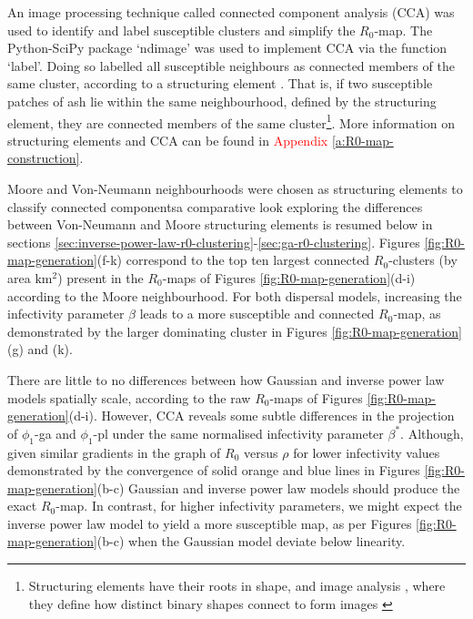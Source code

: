 An image processing technique called connected component analysis (CCA) \cite{CCA1, CCA2} was used to identify and label susceptible clusters and simplify the $R_0$-map. 
The Python-SciPy package `ndimage' \cite{scipy} was used to implement CCA via the function `label'. 
Doing so labelled all susceptible neighbours as connected members of the same cluster, according to a structuring element \cite{liang1989erosion}. 
That is, if two susceptible patches of ash lie within the same neighbourhood, defined by the structuring element, they are connected members of the same cluster\footnote{Structuring elements have their roots in shape, and image analysis \cite{23111}, where they define how distinct binary shapes connect to form images \cite{liang1989erosion, nachtegael2001connections}}. 
More information on structuring elements and CCA can be found in \textcolor{red}{Appendix \ref{a:R0-map-construction}}. %

Moore and Von-Neumann neighbourhoods were chosen as structuring elements to classify connected components\textemdash a comparative look exploring the differences between Von-Neumann and Moore 
structuring elements is resumed below in sections \ref{sec:inverse-power-law-r0-clustering}-\ref{sec:ga-r0-clustering}.  
Figures \ref{fig:R0-map-generation}(f-k) correspond to the top ten largest connected $R_0$-clusters (by area $\mathrm{km^2}$) present in the $R_0$-maps of Figures \ref{fig:R0-map-generation}(d-i) according to the Moore neighbourhood.
For both dispersal models, increasing the infectivity parameter $\beta$ leads to a more susceptible and connected $R_0$-map, as demonstrated by the larger dominating cluster in Figures \ref{fig:R0-map-generation}(g) and (k).

There are little to no differences between how Gaussian and inverse power law models spatially scale, according to the raw $R_0$-maps of Figures \ref{fig:R0-map-generation}(d-i).
However, CCA reveals some subtle differences in the projection of $\phi_1$-ga and $\phi_1$-pl under the same normalised infectivity parameter $\beta^*$.
Although, given similar gradients in the graph of $R_0$ versus $\rho$ for lower infectivity values
\textemdash demonstrated by the convergence of solid orange and blue lines in Figures \ref{fig:R0-map-generation}(b-c)\textemdash 
Gaussian and inverse power law models should produce the exact $R_0$-map.
In contrast, for higher infectivity parameters, we might expect the inverse power law model to yield a more susceptible map, as per Figures \ref{fig:R0-map-generation}(b-c) when the Gaussian model deviate below linearity.

